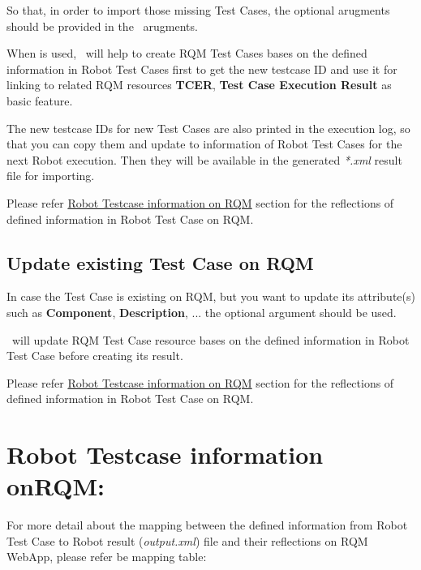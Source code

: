 So that, in order to import those missing  Test Cases, the
optional arugments  should be provided in the \pkg\
arugments.

When  is used, \pkg\ will help to create RQM Test Cases
bases on the defined information in Robot Test Cases first to get the new
testcase ID and use it for linking to related RQM resources \textbf{TCER},
\textbf{Test Case Execution Result} as basic feature.

The new testcase IDs for new Test Cases are also printed in the execution log,
so that you can copy them and update to \rcode{TCID-xxx} information of Robot
Test Cases for the next Robot execution. Then they will be available in the
generated \emph{*.xml} result file for importing.

Please refer \hyperref[description-robot-testcase-information-on-rqm]
{Robot Testcase information on RQM} section for the reflections of defined
information in Robot Test Case on RQM.

\subsection{Update existing Test Case on RQM}
In case the Test Case is existing on RQM, but you want to update its attribute(s)
such as \textbf{Component}, \textbf{Description}, ... the optional argument
\rlog{--updatetestcase} should be used.

\pkg\ will update RQM Test Case resource bases on the defined information in
Robot Test Case before creating its result.

Please refer \hyperref[description-robot-testcase-information-on-rqm]{Robot Testcase information on RQM}
section for the reflections of defined information in Robot Test Case on RQM.

\hypertarget{description-robot-testcase-information-on-rqm}{%
\section{Robot Testcase information onRQM:}
\label{description-robot-testcase-information-on-rqm}}
For more detail about the mapping between the defined information from Robot
Test Case to Robot result (\emph{output.xml}) file and their reflections on
RQM WebApp, please refer be mapping table:

